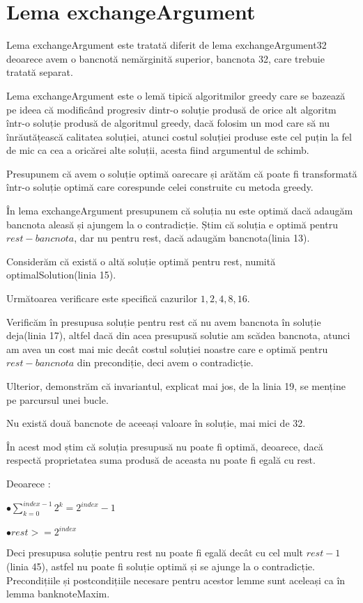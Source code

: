     \section{Lema exchangeArgument}
    Lema exchangeArgument este tratată diferit de lema exchangeArgument32 deoarece avem o bancnotă nemărginită superior, bancnota 32,
    care trebuie tratată separat.\par
    Lema exchangeArgument este o lemă tipică algoritmilor greedy care se bazează pe ideea că modificând progresiv 
    dintr-o soluție produsă de orice alt algoritm într-o soluție produsă de algoritmul greedy, dacă folosim un mod 
    care să nu înrăutățească calitatea soluției, atunci costul soluției produse este cel puțin la fel de mic ca 
    cea a oricărei alte soluții, acesta fiind argumentul de schimb.\par
    Presupunem că avem o soluție optimă oarecare și arătăm că poate fi transformată într-o soluție optimă care corespunde 
    celei construite cu metoda greedy.\par
    În lema exchangeArgument presupunem că soluția nu este optimă dacă adaugăm bancnota aleasă și ajungem la o contradicție.
    Știm că soluția e optimă pentru $rest - bancnota$, dar nu pentru rest, dacă adaugăm bancnota(linia 13).\par
    Considerăm că există o altă soluție optimă pentru rest, numită optimalSolution(linia 15).\par
    Următoarea verificare este specifică cazurilor $1,2,4,8,16$.\par
    Verificăm în presupusa soluție pentru rest că nu avem bancnota în soluție deja(linia 17), altfel dacă din acea presupusă 
    solutie am scădea bancnota, atunci am avea un cost mai mic decât costul soluției noastre care e optimă pentru 
    $rest - bancnota$ din precondiție, deci avem o contradicție.\par
    Ulterior, demonstrăm că invariantul, explicat mai jos, de la linia 19, se menține pe parcursul unei bucle.\par
    Nu există două bancnote de aceeași valoare în soluție, mai mici de 32.\par
    În acest mod știm că soluția presupusă nu poate fi optimă, deoarece, dacă respectă proprietatea
    suma produsă de aceasta nu poate fi egală cu rest. \par
    Deoarece :\par
    $\bullet \sum_{k=0}^{index-1} 2^{k} = 2^{index}-1 $\par
    $\bullet rest > = 2^{index} $ \par
    Deci presupusa soluție pentru rest nu poate fi egală decât cu cel mult $rest- 1$(linia 45), astfel nu poate fi soluție optimă și se ajunge la o contradicție. 
    Precondițiile și postcondițiile necesare pentru acestor lemme sunt aceleași ca în lemma banknoteMaxim.\par
    
